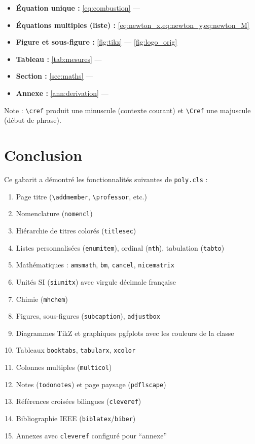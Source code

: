 \documentclass{poly}
\begin{document}
\begin{itemize}[itemsep=3pt]
    \item \textbf{Équation unique :}
          \cref{eq:combustion} — 
    \item \textbf{Équations multiples (liste) :}
          \cref{eq:newton_x,eq:newton_y,eq:newton_M}
    \item \textbf{Figure et sous-figure :}
          \cref{fig:tikz} — \cref{fig:logo_orig}
    \item \textbf{Tableau :}
          \cref{tab:mesures} — 
    \item \textbf{Section :}
          \cref{sec:maths} — 
    \item \textbf{Annexe :}
          \cref{ann:derivation} — 
\end{itemize}

Note : \texttt{\textbackslash cref} produit une minuscule (contexte
courant) et \texttt{\textbackslash Cref} une majuscule (début de phrase).

\section{Conclusion}

Ce gabarit a démontré les fonctionnalités suivantes de \texttt{poly.cls} :

\begin{enumerate}[label=\arabic*., noitemsep]
    \item Page titre (\texttt{\textbackslash addmember}, \texttt{\textbackslash professor}, etc.)
    \item Nomenclature (\texttt{nomencl})
    \item Hiérarchie de titres colorés (\texttt{titlesec})
    \item Listes personnalisées (\texttt{enumitem}), ordinal (\texttt{nth}), tabulation (\texttt{tabto})
    \item Mathématiques : \texttt{amsmath}, \texttt{bm}, \texttt{cancel}, \texttt{nicematrix}
    \item Unités SI (\texttt{siunitx}) avec virgule décimale française
    \item Chimie (\texttt{mhchem})
    \item Figures, sous-figures (\texttt{subcaption}), \texttt{adjustbox}
    \item Diagrammes TikZ et graphiques pgfplots avec les couleurs de la classe
    \item Tableaux \texttt{booktabs}, \texttt{tabularx}, \texttt{xcolor}
    \item Colonnes multiples (\texttt{multicol})
    \item Notes (\texttt{todonotes}) et page paysage (\texttt{pdflscape})
    \item Références croisées bilingues (\texttt{cleveref})
    \item Bibliographie IEEE (\texttt{biblatex}/\texttt{biber}) \cite{intdesign20discoverability}
    \item Annexes avec \texttt{cleveref} configuré pour ``annexe''
\end{enumerate}
\end{document}
